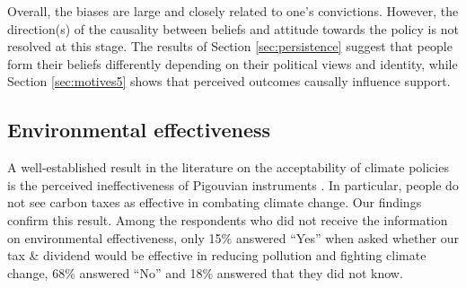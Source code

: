 \documentclass[12pt]{article} %
\begin{document}
Overall, the biases are large and closely related to one's convictions. However, the direction(s) of the causality between beliefs and attitude towards the policy is not resolved at this stage. The results of Section \ref{sec:persistence} suggest that people form their beliefs differently depending on their political views and identity, while Section \ref{sec:motives5} shows that perceived outcomes causally influence support.

\subsection{Environmental effectiveness\label{subsec:perception_ee}}

A well-established result in the literature on the acceptability of climate policies is the perceived ineffectiveness of Pigouvian instruments \citep[e.g.,][]{dresner_social_2006,kallbekken_et_al_2011, baranzini_effectiveness_2017}. In particular, people do not see carbon taxes as effective in combating climate change. Our findings confirm this result. Among the respondents who did not receive the information on environmental effectiveness, only 15\% answered ``Yes'' when asked whether our tax \& dividend would be effective in reducing pollution and fighting climate change, 68\% answered ``No'' and 18\% answered that they did not know.


\end{document}

